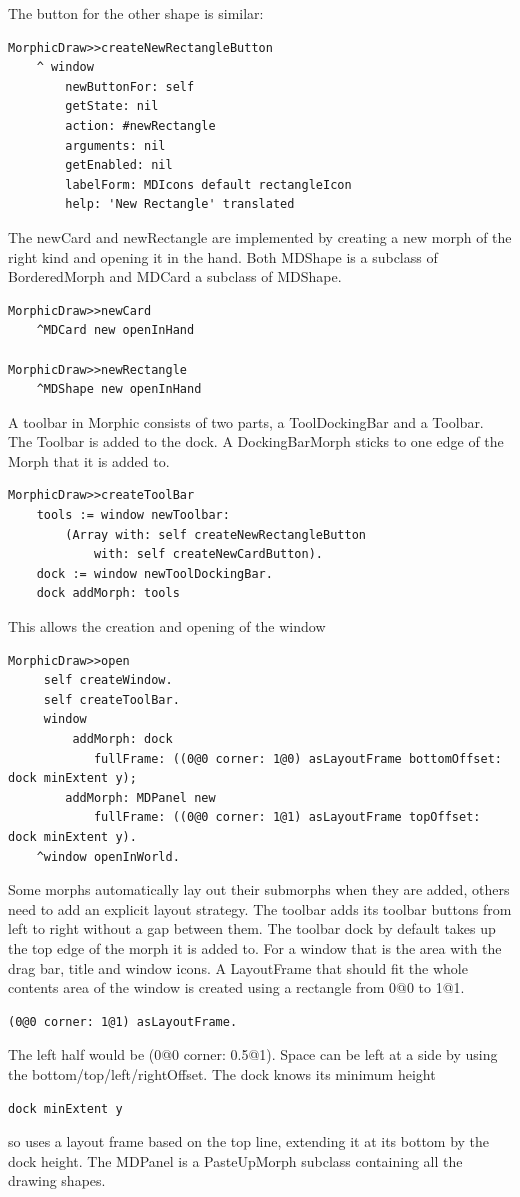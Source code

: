 \documentclass[10pt, twoside]{article}   	%
\begin{document}
The button for the other shape is similar:
\begin{verbatim}
MorphicDraw>>createNewRectangleButton
    ^ window
        newButtonFor: self
        getState: nil
        action: #newRectangle
        arguments: nil
        getEnabled: nil
        labelForm: MDIcons default rectangleIcon
        help: 'New Rectangle' translated
\end{verbatim}

The newCard and newRectangle are implemented by creating a
new morph of the right kind and opening it in the hand. Both MDShape is a
subclass of BorderedMorph and MDCard a subclass of MDShape.

\begin{verbatim}
MorphicDraw>>newCard
    ^MDCard new openInHand

MorphicDraw>>newRectangle
    ^MDShape new openInHand
\end{verbatim}

A toolbar in Morphic consists of two parts, a ToolDockingBar and
a Toolbar. The Toolbar is added to the dock. A DockingBarMorph 
sticks to one edge of the Morph that it is added to.

\begin{verbatim}
MorphicDraw>>createToolBar
    tools := window newToolbar: 
        (Array with: self createNewRectangleButton 
            with: self createNewCardButton).
    dock := window newToolDockingBar.
    dock addMorph: tools
\end{verbatim}
This allows the creation and opening of the window
\begin{verbatim}
MorphicDraw>>open
     self createWindow.
     self createToolBar.
     window
         addMorph: dock
            fullFrame: ((0@0 corner: 1@0) asLayoutFrame bottomOffset: dock minExtent y);
        addMorph: MDPanel new 			
            fullFrame: ((0@0 corner: 1@1) asLayoutFrame topOffset: dock minExtent y).
    ^window openInWorld.
\end{verbatim}
Some morphs automatically lay out their submorphs when they are added,
others need to add an explicit layout strategy. The toolbar adds its toolbar buttons
from left to right without a gap between them.  
The toolbar dock by default takes up the top edge of the morph it is added to. 
For a window that is the area with the drag bar, title and window icons. 
A LayoutFrame that should fit the whole contents area of the window is
created using a rectangle from 0@0 to 1@1.
\begin{verbatim}
(0@0 corner: 1@1) asLayoutFrame.   
\end{verbatim}
The left half would be (0@0 corner: 0.5@1).
Space can be left at a side by using the bottom/top/left/rightOffset.
The dock knows its minimum height
\begin{verbatim}
dock minExtent y
\end{verbatim}
so uses a layout frame based on the top line, extending it at its bottom
by the dock height. The MDPanel is a PasteUpMorph subclass containing
all the drawing shapes.
\end{document}
